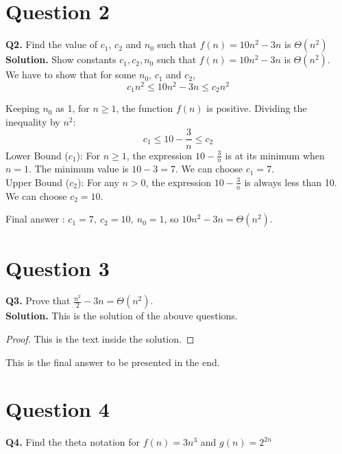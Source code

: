 \documentclass[11pt]{article}
\begin{document}
\section*{Question 2}
\textbf{Q2.} Find the value of $c_1$, $c_2$ and $n_0$ such that $f(n)=10n^2-3n$ is $\Theta(n^2)$ \\[1em]

\textbf{Solution. } Show constants $c_1,c_2,n_0$ such that $f(n)=10n^2-3n$ is $\Theta(n^2)$. \\

We have to show that for some $n_0$, $c_1$ and $c_2$, 
\[
  c_1 n^2 \le 10n^2 - 3n \le c_2 n^2
\]

Keeping $n_0$ as 1,  for $n \ge 1$, the function $f(n)$ is positive.
Dividing the inequality by $n^2$:
$$c_1 \le 10 - \frac{3}{n} \le c_2$$
Lower Bound ($c_1$): For $n \ge 1$, the expression $10 - \frac{3}{n}$ is at its minimum when $n=1$. The minimum value is $10 - 3 = 7$. We can choose $c_1 = 7$. \\
Upper Bound ($c_2$): For any $n>0$, the expression $10 - \frac{3}{n}$ is always less than 10. We can choose $c_2 = 10$. \\

\begin{finalanswer}
Final answer : $c_1=7,\ c_2=10,\ n_0=1$, so $10n^2-3n = \Theta(n^2)$.
\end{finalanswer}

\section{Question 3}
\textbf{Q3.} Prove that $\frac{n^2}{2}-3n=\Theta(n^2)$.  \\[1em]

\textbf{Solution. } This is the solution of the abouve questions. 
\begin{proof}
This is the text inside the solution. 
\end{proof}

\begin{finalanswer}
This is the final answer to be presented in the end. 
\end{finalanswer}

\section{Question 4}
\textbf{Q4.} Find the theta notation for $f(n)=3n^3$ and $g(n)=2^{2n}$
\end{document}
